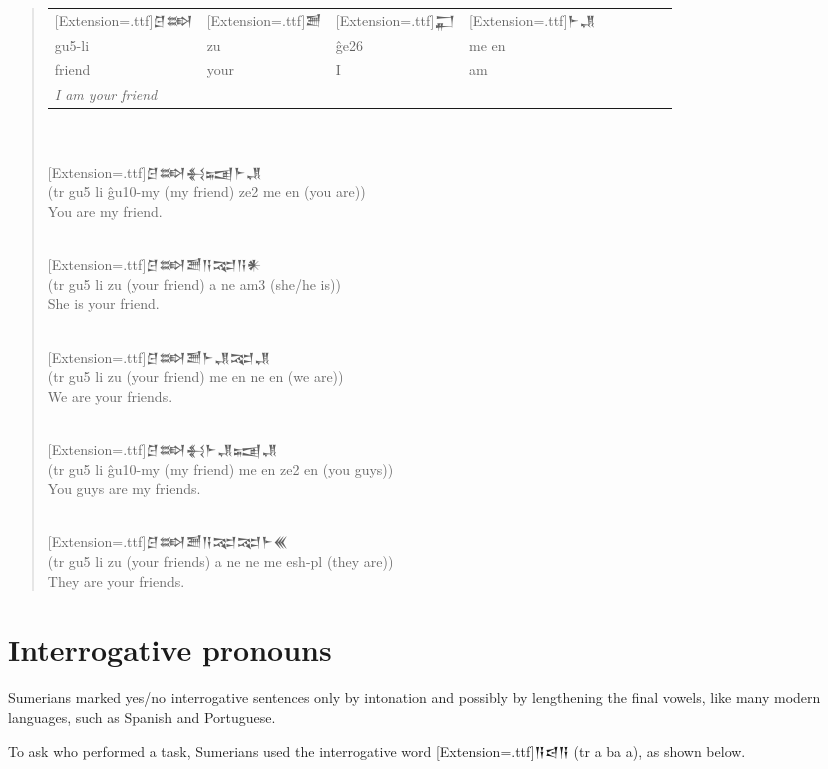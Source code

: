 \documentclass[a4paper,12pt]{book}
\newcommand{\fcn}{\setmainfont{Akkadian}[Extension=.ttf]}
\newcommand{\fsm}{\Large\setmainfont{Akkadian}[Extension=.ttf]}
\begin{document}
\begin{quotation}
\noindent
\begin{tabular}[!h]{l l l l l l l l l}
\fsm 𒆪𒇷 &\fsm 𒍪 &\fsm 𒂷 &\fsm 𒈨𒂗\\ 
gu5-li & zu & ĝe26 & me en\\
friend & your & I & am\\
\multicolumn{4}{l}{\em I am your friend}\\
\end{tabular}\verb||\\

\verb||\\
{\fsm 𒆪𒇷𒈬𒍢𒈨𒂗 }\\
(tr gu5 li ĝu10-my (my friend) ze2 me en (you are))\\     
You are my friend.

\verb||\\
{\fsm 𒆪𒇷𒍪𒀀𒉈𒀀𒀭}\\
(tr gu5 li zu (your friend) a ne am3 (she/he is))\\     
She is your friend.

\verb||\\
{\fsm 𒆪𒇷𒍪𒈨𒂗𒉈𒂗}\\
(tr gu5 li zu (your friend) me en ne en (we are))\\
We are your friends.

\verb||\\
{\fsm 𒆪𒇷𒈬𒈨𒂗𒍢𒂗}\\
(tr gu5 li ĝu10-my (my friend) me en ze2 en (you guys))\\
You guys are my friends.

\verb||\\
{\fsm 𒆪𒇷𒍪𒀀𒉈𒉈𒈨𒌍}\\
(tr gu5 li zu (your friends) a ne ne me esh-pl (they are))\\
They are your friends.\\
\end{quotation}

\newpage
\section*{Interrogative pronouns}
Sumerians marked yes/no interrogative sentences
only by intonation and possibly by lengthening
the final vowels, like many modern languages,
such as Spanish and Portuguese.

To ask who performed a task, Sumerians used
the interrogative word {\fcn 𒀀𒁀𒀀} (tr a ba a),
as shown below.\\
\end{document}
